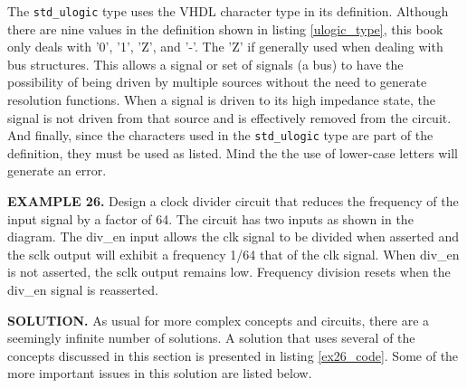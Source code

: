 The \texttt{std\_ulogic} type uses the VHDL character type in its definition. Although there are nine values in the definition shown in listing \ref{ulogic_type}, this book only deals with '0', '1', 'Z', and '-'. The 'Z' if generally used when dealing with bus structures. This allows a signal or set of signals (a bus) to have the possibility of being driven by multiple sources without the need to generate resolution functions. When a signal is driven to its high impedance state, the signal is not driven from that source and is effectively removed from the circuit. And finally, since the characters used in the \texttt{std\_ulogic} type are part of the definition, they must be used as listed. Mind the the use of lower-case letters will generate an error. 
\begin{leftbar}
\begin{minipage}[t]{0.52\textwidth}
\noindent
\textbf{EXAMPLE 26.}
Design a clock divider circuit that reduces the frequency of the input signal by a factor of 64. The circuit has two inputs as shown in the diagram. The div\_en input allows the clk signal to be divided when asserted and the sclk output will exhibit a frequency 1/64 that of the clk signal. When div\_en is not asserted, the sclk output remains low. Frequency division resets when the div\_en signal is reasserted.
\end{minipage}
\begin{minipage}[t]{0.4\linewidth}
\vspace{10pt}
\begin{flushright}
\end{flushright}
\end{minipage}
\end{leftbar}
\noindent
\textbf{SOLUTION.} As usual for more complex concepts and circuits, there are a seemingly infinite number of solutions. A solution that uses several of the concepts discussed in this section is presented in listing \ref{ex26_code}. Some of the more important issues in this solution are listed below.

